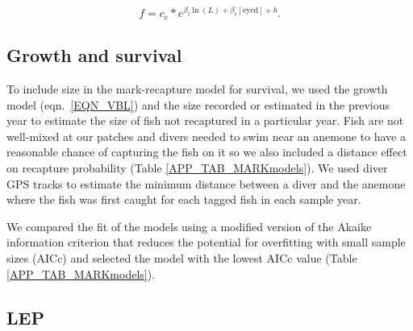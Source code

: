 \documentclass[12pt, oneside]{article}   	%
\begin{document}
\begin{equation}
f = c_e * e^{\beta_l\ln(L) + \beta_e[\text{eyed}] + b}. \label{EQN_Fec}
\end{equation}

\subsection{Growth and survival} \label{APP_SEC_METHODS_Growth_and_survival}

To include size in the mark-recapture model for survival, we used the growth model (eqn.\ \ref{EQN_VBL}) and the size recorded or estimated in the previous year to estimate the size of fish not recaptured in a particular year. Fish are not well-mixed at our patches and divers needed to swim near an anemone to have a reasonable chance of capturing the fish on it so we also included a distance effect on recapture probability (Table \ref{APP_TAB_MARKmodels}). We used diver GPS tracks to estimate the minimum distance between a diver and the anemone where the fish was first caught for each tagged fish in each sample year.

We compared the fit of the models using a modified version of the Akaike information criterion that reduces the potential for overfitting with small sample sizes (AICc) and selected the model with the lowest AICc value (Table \ref{APP_TAB_MARKmodels}).




\subsection{LEP} \label{APP_SEC_METHODS_LEP}
\end{document}
